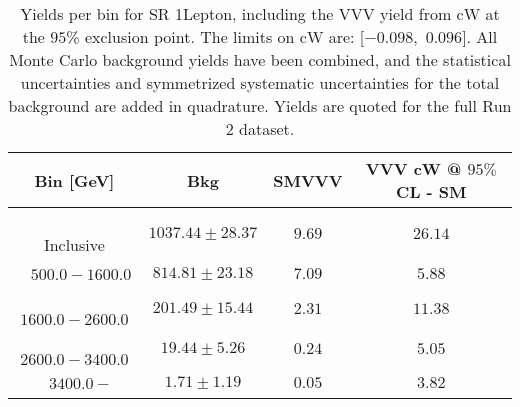 \begin{table}[!htbp]
    \small
    \center
    \begin{tabular}{c||c|c|c}
    Bin [GeV] & Bkg & SMVVV & \pbox{20cm}{VVV \\ cW @ $95\%$ CL - SM \\ }\\
    \hline
    \pbox{20cm}{ ~ \\Inclusive\\ } & $1037.44 \pm 28.37$ & $9.69$ & $26.14$\\
    \hline
    \pbox{20cm}{ ~ \\$500.0-1600.0$\\ } & $814.81 \pm 23.18$ & $7.09$ & $5.88$\\
    \hline
    \pbox{20cm}{ ~ \\$1600.0-2600.0$\\ } & $201.49 \pm 15.44$ & $2.31$ & $11.38$\\
    \hline
    \pbox{20cm}{ ~ \\$2600.0-3400.0$\\ } & $19.44 \pm 5.26$ & $0.24$ & $5.05$\\
    \hline
    \pbox{20cm}{ ~ \\$3400.0-$\\ } & $1.71 \pm 1.19$ & $0.05$ & $3.82$\\
\end{tabular}
    \caption{Yields per bin for SR 1Lepton, including the VVV yield from cW at the $95$\% exclusion point. The limits on cW are: [$-0.098$,~$0.096$]. All Monte Carlo background yields have been combined, and the statistical uncertainties and symmetrized systematic uncertainties for the total background are added in quadrature. Yields are quoted for the full Run 2 dataset.}
    \label{tab:1Lepton$binssignal}
\end{table}
